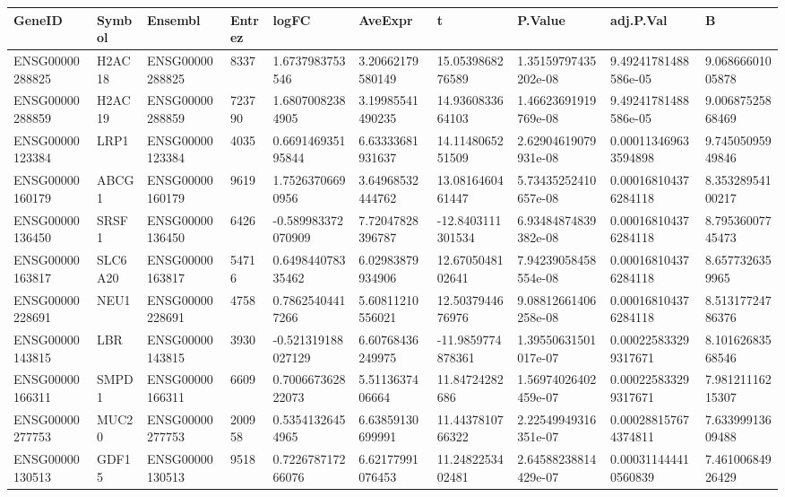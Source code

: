 \begingroup
\tiny
\setlength{\tabcolsep}{2pt}
\renewcommand{\arraystretch}{1.18}
\begin{tabular}{@{}llllllllll@{}}
\toprule
GeneID & Symbol & Ensembl & Entrez & logFC & AveExpr & t & P.Value & adj.P.Val & B \\
\midrule
ENSG00000288825 & H2AC18 & ENSG00000288825 & 8337 & 1.6737983753546 & 3.20662179580149 & 15.0539868276589 & 1.35159797435202e-08 & 9.49241781488586e-05 & 9.06866601005878 \\
ENSG00000288859 & H2AC19 & ENSG00000288859 & 723790 & 1.68070082384905 & 3.19985541490235 & 14.9360833664103 & 1.46623691919769e-08 & 9.49241781488586e-05 & 9.00687525868469 \\
ENSG00000123384 & LRP1 & ENSG00000123384 & 4035 & 0.669146935195844 & 6.63333681931637 & 14.1148065251509 & 2.62904619079931e-08 & 0.000113469633594898 & 9.74505095949846 \\
ENSG00000160179 & ABCG1 & ENSG00000160179 & 9619 & 1.75263706690956 & 3.64968532444762 & 13.0816460461447 & 5.73435252410657e-08 & 0.000168104376284118 & 8.35328954100217 \\
ENSG00000136450 & SRSF1 & ENSG00000136450 & 6426 & -0.589983372070909 & 7.72047828396787 & -12.8403111301534 & 6.93484874839382e-08 & 0.000168104376284118 & 8.79536007745473 \\
ENSG00000163817 & SLC6A20 & ENSG00000163817 & 54716 & 0.649844078335462 & 6.02983879934906 & 12.6705048102641 & 7.94239058458554e-08 & 0.000168104376284118 & 8.6577326359965 \\
ENSG00000228691 & NEU1 & ENSG00000228691 & 4758 & 0.78625404417266 & 5.60811210556021 & 12.5037944676976 & 9.08812661406258e-08 & 0.000168104376284118 & 8.51317724786376 \\
ENSG00000143815 & LBR & ENSG00000143815 & 3930 & -0.521319188027129 & 6.60768436249975 & -11.9859774878361 & 1.39550631501017e-07 & 0.000225833299317671 & 8.10162683568546 \\
ENSG00000166311 & SMPD1 & ENSG00000166311 & 6609 & 0.700667362822073 & 5.5113637406664 & 11.84724282686 & 1.56974026402459e-07 & 0.000225833299317671 & 7.98121116215307 \\
ENSG00000277753 & MUC20 & ENSG00000277753 & 200958 & 0.53541326454965 & 6.63859130699991 & 11.4437810766322 & 2.22549949316351e-07 & 0.000288157674374811 & 7.63399913609488 \\
ENSG00000130513 & GDF15 & ENSG00000130513 & 9518 & 0.722678717266076 & 6.62177991076453 & 11.2482253402481 & 2.64588238814429e-07 & 0.000311444410560839 & 7.46100684926429 \\

\end{tabular}
